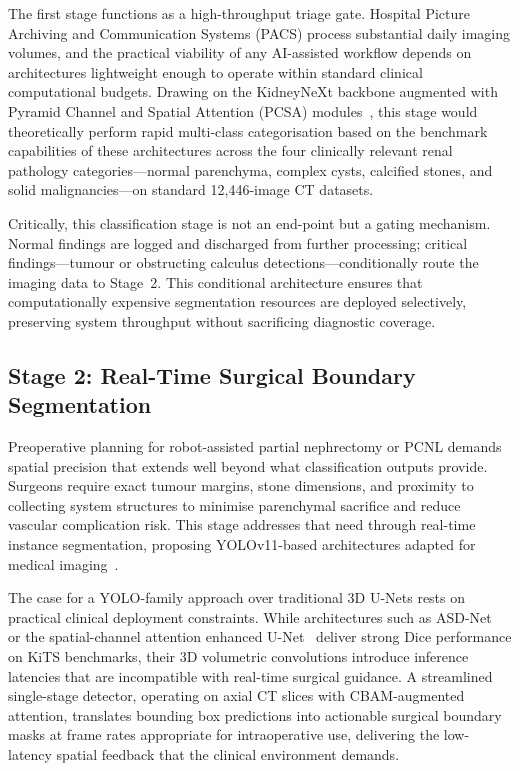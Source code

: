 \documentclass[pdflatex,sn-mathphys-num]{sn-jnl}%
\begin{document}
The first stage functions as a high-throughput triage gate. Hospital Picture Archiving and Communication Systems (PACS) process substantial daily imaging volumes, and the practical viability of any AI-assisted workflow depends on architectures lightweight enough to operate within standard clinical computational budgets. Drawing on the KidneyNeXt backbone augmented with Pyramid Channel and Spatial Attention (PCSA) modules~\cite{alqahtani2025kidneynext, tawfik2026pcsa}, this stage would theoretically perform rapid multi-class categorisation based on the benchmark capabilities of these architectures across the four clinically relevant renal pathology categories---normal parenchyma, complex cysts, calcified stones, and solid malignancies---on standard 12,446-image CT datasets. 

Critically, this classification stage is not an end-point but a gating mechanism. Normal findings are logged and discharged from further processing; critical findings---tumour or obstructing calculus detections---conditionally route the imaging data to Stage~2. This conditional architecture ensures that computationally expensive segmentation resources are deployed selectively, preserving system throughput without sacrificing diagnostic coverage.

\subsection{Stage 2: Real-Time Surgical Boundary Segmentation}
\label{subsec:stage2_segmentation}

Preoperative planning for robot-assisted partial nephrectomy or PCNL demands spatial precision that extends well beyond what classification outputs provide. Surgeons require exact tumour margins, stone dimensions, and proximity to collecting system structures to minimise parenchymal sacrifice and reduce vascular complication risk. This stage addresses that need through real-time instance segmentation, proposing YOLOv11-based architectures adapted for medical imaging~\cite{akhtar2026yolov11}.

The case for a YOLO-family approach over traditional 3D U-Nets rests on practical clinical deployment constraints. While architectures such as ASD-Net~\cite{ji2024asdnet} or the spatial-channel attention enhanced U-Net~\cite{gohil2024kidney} deliver strong Dice performance on KiTS benchmarks, their 3D volumetric convolutions introduce inference latencies that are incompatible with real-time surgical guidance. A streamlined single-stage detector, operating on axial CT slices with CBAM-augmented attention, translates bounding box predictions into actionable surgical boundary masks at frame rates appropriate for intraoperative use, delivering the low-latency spatial feedback that the clinical environment demands.
\end{document}
